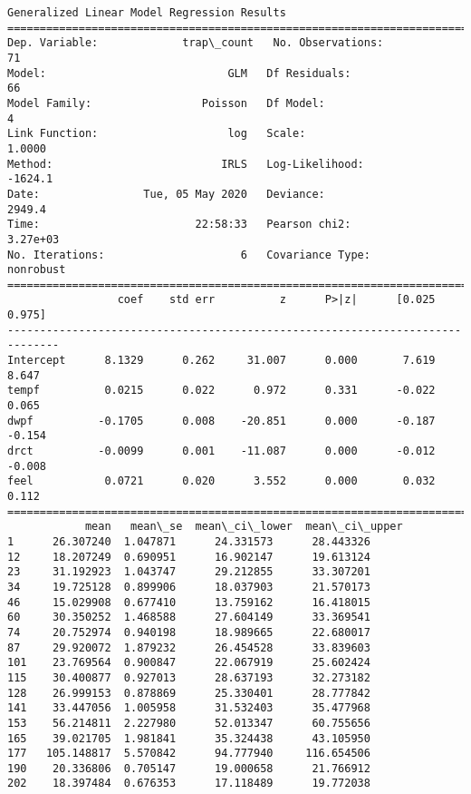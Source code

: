 \documentclass[11pt]{article}
\begin{document}
    \begin{Verbatim}[commandchars=\\\{\}]
                 Generalized Linear Model Regression Results                  
==============================================================================
Dep. Variable:             trap\_count   No. Observations:                   71
Model:                            GLM   Df Residuals:                       66
Model Family:                 Poisson   Df Model:                            4
Link Function:                    log   Scale:                          1.0000
Method:                          IRLS   Log-Likelihood:                -1624.1
Date:                Tue, 05 May 2020   Deviance:                       2949.4
Time:                        22:58:33   Pearson chi2:                 3.27e+03
No. Iterations:                     6   Covariance Type:             nonrobust
==============================================================================
                 coef    std err          z      P>|z|      [0.025      0.975]
------------------------------------------------------------------------------
Intercept      8.1329      0.262     31.007      0.000       7.619       8.647
tempf          0.0215      0.022      0.972      0.331      -0.022       0.065
dwpf          -0.1705      0.008    -20.851      0.000      -0.187      -0.154
drct          -0.0099      0.001    -11.087      0.000      -0.012      -0.008
feel           0.0721      0.020      3.552      0.000       0.032       0.112
==============================================================================
            mean   mean\_se  mean\_ci\_lower  mean\_ci\_upper
1      26.307240  1.047871      24.331573      28.443326
12     18.207249  0.690951      16.902147      19.613124
23     31.192923  1.043747      29.212855      33.307201
34     19.725128  0.899906      18.037903      21.570173
46     15.029908  0.677410      13.759162      16.418015
60     30.350252  1.468588      27.604149      33.369541
74     20.752974  0.940198      18.989665      22.680017
87     29.920072  1.879232      26.454528      33.839603
101    23.769564  0.900847      22.067919      25.602424
115    30.400877  0.927013      28.637193      32.273182
128    26.999153  0.878869      25.330401      28.777842
141    33.447056  1.005958      31.532403      35.477968
153    56.214811  2.227980      52.013347      60.755656
165    39.021705  1.981841      35.324438      43.105950
177   105.148817  5.570842      94.777940     116.654506
190    20.336806  0.705147      19.000658      21.766912
202    18.397484  0.676353      17.118489      19.772038

\end{Verbatim}
\end{document}
